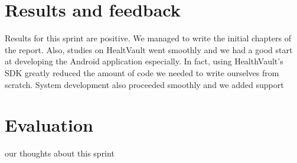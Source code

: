 \section{Results and feedback}

Results for this sprint are positive. We managed to write the initial chapters of the report.
Also, studies on HealtVault went smoothly and we had a good start at developing the Android application
especially. In fact, using HealthVault's SDK greatly reduced the amount of code we needed to write ourselves
from scratch.
System development also proceeded smoothly and we added support

\section{Evaluation}

our thoughts about this sprint